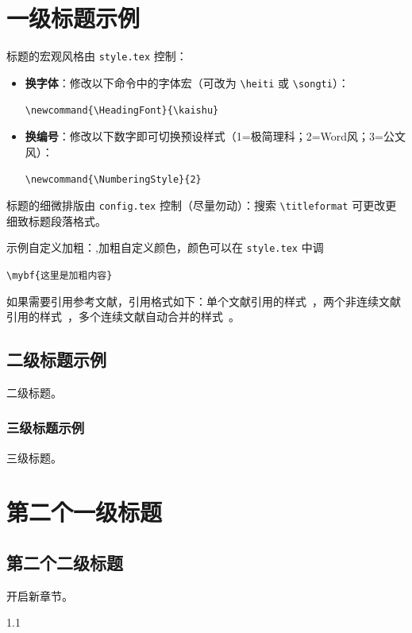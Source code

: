 \section{一级标题示例}

标题的宏观风格由 \texttt{style.tex} 控制：
\begin{itemize}
  \item \textbf{换字体}：修改以下命令中的字体宏（可改为 \verb|\heiti| 或 \verb|\songti|）：
  \begin{codebox}
  \verb|\newcommand{\HeadingFont}{\kaishu}|
  \end{codebox}
  
  \item \textbf{换编号}：修改以下数字即可切换预设样式（1=极简理科；2=Word风；3=公文风）：
  \begin{codebox}
  \verb|\newcommand{\NumberingStyle}{2}|
  \end{codebox}
\end{itemize}

标题的细微排版由 \texttt{config.tex} 控制（尽量勿动）：搜索 \verb|\titleformat| 可更改更细致标题段落格式。

示例自定义加粗：,加粗自定义颜色，颜色可以在 \texttt{style.tex} 中调
\begin{itemize}
    \begin{codebox}
    \verb|\mybf{这里是加粗内容}|
    \end{codebox}
\end{itemize}

如果需要引用参考文献，引用格式如下：单个文献引用的样式~\citep{Ref1}，两个非连续文献引用的样式~\cite{Ref1, Ref3}，多个连续文献自动合并的样式~\cite{Ref1, Ref2, Ref3}。

\subsection{二级标题示例}
二级标题。

\subsubsection{三级标题示例}
三级标题。

\section{第二个一级标题}

\subsection{第二个二级标题}
开启新章节。


\begin{spacing}{1.1}
\vspace{0.5em}
{\wuhao \rmfamily %

\renewcommand{\refname}{参考文献\vspace{0em}}

\vspace{11bp}
}
\end{spacing}